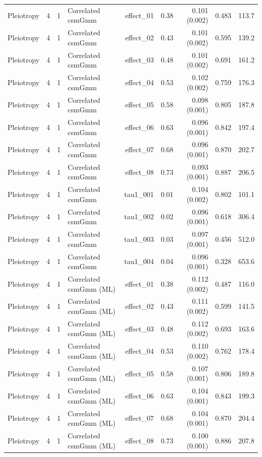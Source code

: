 \begin{longtable}{lcclrrrrr}
Pleiotropy & 4 & 1 & Correlated csmGmm & effect\_01 & 0.38 & 0.101 (0.002) & 0.483 & 113.7\\
Pleiotropy & 4 & 1 & Correlated csmGmm & effect\_02 & 0.43 & 0.101 (0.002) & 0.595 & 139.2\\
Pleiotropy & 4 & 1 & Correlated csmGmm & effect\_03 & 0.48 & 0.101 (0.002) & 0.691 & 161.2\\
Pleiotropy & 4 & 1 & Correlated csmGmm & effect\_04 & 0.53 & 0.102 (0.002) & 0.759 & 176.3\\
Pleiotropy & 4 & 1 & Correlated csmGmm & effect\_05 & 0.58 & 0.098 (0.001) & 0.805 & 187.8\\
Pleiotropy & 4 & 1 & Correlated csmGmm & effect\_06 & 0.63 & 0.096 (0.001) & 0.842 & 197.4\\
Pleiotropy & 4 & 1 & Correlated csmGmm & effect\_07 & 0.68 & 0.096 (0.001) & 0.870 & 202.7\\
Pleiotropy & 4 & 1 & Correlated csmGmm & effect\_08 & 0.73 & 0.093 (0.001) & 0.887 & 206.5\\
Pleiotropy & 4 & 1 & Correlated csmGmm & tau1\_001 & 0.01 & 0.104 (0.002) & 0.802 & 101.1\\
Pleiotropy & 4 & 1 & Correlated csmGmm & tau1\_002 & 0.02 & 0.096 (0.001) & 0.618 & 306.4\\
Pleiotropy & 4 & 1 & Correlated csmGmm & tau1\_003 & 0.03 & 0.097 (0.001) & 0.456 & 512.0\\
Pleiotropy & 4 & 1 & Correlated csmGmm & tau1\_004 & 0.04 & 0.096 (0.001) & 0.328 & 653.6\\
Pleiotropy & 4 & 1 & Correlated csmGmm (ML) & effect\_01 & 0.38 & 0.112 (0.002) & 0.487 & 116.0\\
Pleiotropy & 4 & 1 & Correlated csmGmm (ML) & effect\_02 & 0.43 & 0.111 (0.002) & 0.599 & 141.5\\
Pleiotropy & 4 & 1 & Correlated csmGmm (ML) & effect\_03 & 0.48 & 0.112 (0.002) & 0.693 & 163.6\\
Pleiotropy & 4 & 1 & Correlated csmGmm (ML) & effect\_04 & 0.53 & 0.110 (0.002) & 0.762 & 178.4\\
Pleiotropy & 4 & 1 & Correlated csmGmm (ML) & effect\_05 & 0.58 & 0.107 (0.001) & 0.806 & 189.8\\
Pleiotropy & 4 & 1 & Correlated csmGmm (ML) & effect\_06 & 0.63 & 0.104 (0.001) & 0.843 & 199.3\\
Pleiotropy & 4 & 1 & Correlated csmGmm (ML) & effect\_07 & 0.68 & 0.104 (0.001) & 0.870 & 204.4\\
Pleiotropy & 4 & 1 & Correlated csmGmm (ML) & effect\_08 & 0.73 & 0.100 (0.001) & 0.886 & 207.8\\

\end{longtable}
